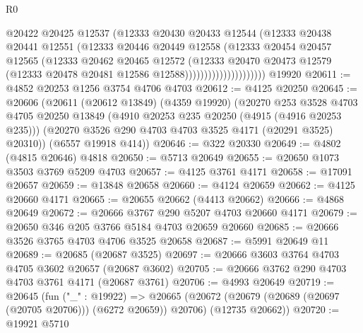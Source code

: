 \begin{lexlean}{R0}
\begin{coremodule}
                                @20422
                                @20425
                                @12537
                                (@12333
                                  @20430
                                  @20433
                                  @12544
                                  (@12333
                                    @20438
                                    @20441
                                    @12551
                                    (@12333
                                      @20446
                                      @20449
                                      @12558
                                      (@12333
                                        @20454
                                        @20457
                                        @12565
                                        (@12333
                                          @20462
                                          @20465
                                          @12572
                                          (@12333
                                            @20470
                                            @20473
                                            @12579
                                            (@12333 @20478 @20481 @12586 @12588)))))))))))))))))))))
    @19920
@20611 := @4852 @20253 @1256 @3754 @4706 @4703
@20612 := @4125 @20250
@20645 := @20606
    (@20611
      (@20612 @13849)
      (@4359 @19920)
      (@20270
        @253
        @3528
        @4703
        @4705
        @20250
        @13849
        (@4910 @20253 @235 @20250 (@4915 (@4916 @20253 @235)))
        (@20270 @3526 @290 @4703 @4703 @3525 @4171 (@20291 @3525) @20310))
      (@6557 @19918 @414))
@20646 := @322 @20330
@20649 := @4802 (@4815 @20646) @4818
@20650 := @5713 @20649
@20655 := @20650 @1073 @3503 @3769 @5209 @4703
@20657 := @4125 @3761 @4171
@20658 := @17091 @20657
@20659 := @13848 @20658
@20660 := @4124 @20659
@20662 := @4125 @20660 @4171
@20665 := @20655 @20662 (@4413 @20662)
@20666 := @4868 @20649
@20672 := @20666 @3767 @290 @5207 @4703 @20660 @4171
@20679 := @20650 @346 @205 @3766 @5184 @4703 @20659 @20660
@20685 := @20666 @3526 @3765 @4703 @4706 @3525 @20658
@20687 := @5991 @20649 @11
@20689 := @20685 (@20687 @3525)
@20697 := @20666 @3603 @3764 @4703 @4705 @3602 @20657 (@20687 @3602)
@20705 := @20666 @3762 @290 @4703 @4703 @3761 @4171 (@20687 @3761)
@20706 := @4993 @20649
@20719 := @20645
    (fun ("_" : @19922) =>
    @20665
      (@20672 (@20679 (@20689 (@20697 (@20705 @20706))) (@6272 @20659)) @20706)
      (@12735 @20662))
@20720 := @19921 @5710

\end{coremodule}
\end{lexlean}
